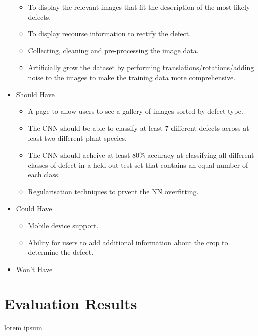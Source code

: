 \begin{itemize}
\begin{itemize}
      	\item To display the relevant images that fit the description of the most likely defects.\checkmark
      	\item To display recourse information to rectify the defect.\checkmark
      	\item Collecting, cleaning and pre-processing the image data. \checkmark
        \item Artificially grow the dataset by performing translations/rotations/adding noise to the images to make the training data more comprehensive.\checkmark
      \end{itemize}
      \item Should Have
      \begin{itemize}
        \item A page to allow users to see a gallery of images sorted by
          defect type. \checkmark
        \item The CNN should be able to classify at least 7 different defects across at least two different plant species. \checkmark
        \item The CNN should acheive at least 80\% accuracy at classifying all different classes of defect in a held out test set that contains an equal number of each class. \checkmark
      	\item Regularisation techniques to prvent the NN overfitting. \checkmark
      \end{itemize}
      \item Could Have
        \begin{itemize}
          \item Mobile device support. \checkmark
        \end{itemize}
      \begin{itemize}
        \item Ability for users to add additional information about the crop
          to determine the defect.
      \end{itemize}
      \item Won't Have
    \end{itemize}

\section{Evaluation Results}
  lorem ipsum
